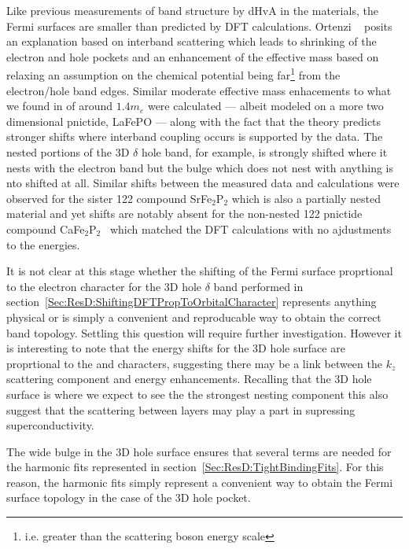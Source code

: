 Like previous measurements of band structure by \ac{dHvA} in the \BaFePAs materials, the Fermi surfaces are smaller than predicted by \ac{DFT} calculations\cite{Shishido2010, Analytis2010c}. Ortenzi \etal~\cite{Ortenzi2009} posits an explanation based on interband scattering which leads to shrinking of the electron and hole pockets and an enhancement of the effective mass based on relaxing an assumption on the chemical potential being far\footnote{i.e. greater than the scattering boson energy scale} from the electron/hole band edges. Similar moderate effective mass enhacements to what we found in \BaFeP of around $1.4m_e$ were calculated --- albeit modeled on a more two dimensional pnictide, LaFePO --- along with the fact that the theory predicts stronger shifts where interband coupling occurs is supported by the \BaFeP data. The nested portions of the 3D $\delta$ hole band, for example, is strongly shifted where it nests with the electron band but the bulge which does not nest with anything is nto shifted at all. Similar shifts between the measured data and calculations were observed for the sister 122 compound SrFe$_2$P$_2$\cite{Analytis2009} which is also a partially nested material and yet shifts are notably absent for the non-nested 122 pnictide compound CaFe$_2$P$_2$~\cite{Coldea2009} which matched the \ac{DFT} calculations with no ajdustments to the energies. 


It is not clear at this stage whether the shifting of the Fermi surface proprtional to the electron character for the 3D hole $\delta$ band performed in section~\ref{Sec:ResD:ShiftingDFTPropToOrbitalCharacter} represents anything physical or is simply a convenient and reproducable way to obtain the correct band topology. Settling this question will require further investigation. However it is interesting to note that the energy shifts for the 3D hole surface are proprtional to the \DzTwo and \DxzDyz characters, suggesting there may be a link between the $k_z$ scattering component and energy enhancements. Recalling that the 3D hole surface is where we expect to see the the strongest nesting component this also suggest that the scattering between layers may play a part in supressing superconductivity.

The wide bulge in the 3D hole surface ensures that several terms are needed for the harmonic fits represented in section~\ref{Sec:ResD:TightBindingFits}. For this reason, the harmonic fits simply represent a convenient way to obtain the Fermi surface topology in the case of the 3D hole pocket.
